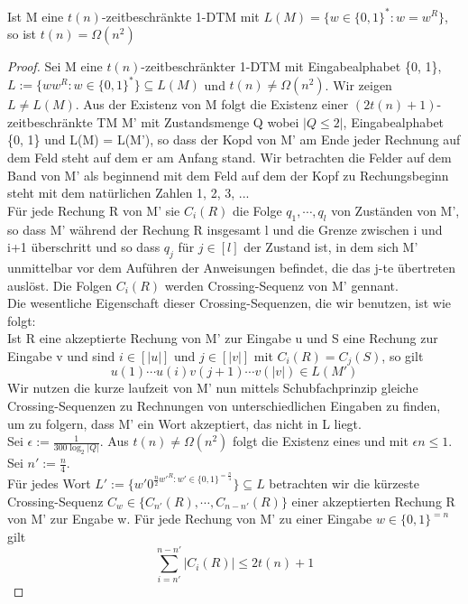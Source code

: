     Ist M eine \(t(n)\)-zeitbeschränkte 1-DTM mit \(L(M) = \{w \in \{0, 1\}^* : w = w^R\}\), so ist \(t(n) = \Omega (n^2)\)
    \begin{proof}
        Sei M eine \(t(n)\)-zeitbeschränkter 1-DTM mit Eingabealphabet \{0, 1\}, \(L := \{ww^R : w \in \{0, 1\}^*\} \subseteq L(M)\) und \(t(n) \not = \Omega (n^2)\). Wir zeigen \(L \not = L(M)\). Aus der Existenz von M folgt die Existenz einer \((2t(n) + 1)\)-zeitbeschränkte TM M' mit Zustandsmenge Q wobei \(|Q \leq 2|\), Eingabealphabet \{0, 1\} und L(M) = L(M'), so dass der Kopd von M' am Ende jeder Rechnung auf dem Feld steht auf dem er am Anfang stand. Wir betrachten die Felder auf dem Band von M' als beginnend mit dem Feld auf dem der Kopf zu Rechungsbeginn steht mit dem natürlichen Zahlen 1, 2, 3, ...\\ Für jede Rechung R von M' sie \(C_i (R)\) die Folge \(q_1, \cdots, q_l\) von Zuständen von M', so dass M' während der Rechung R insgesamt l und die Grenze zwischen i und i+1 überschritt und so dass \(q_j\) für \(j \in [l]\) der Zustand ist, in dem sich M' unmittelbar vor dem Auführen der Anweisungen befindet, die das j-te übertreten auslöst. Die Folgen \(C_i(R)\) werden Crossing-Sequenz von M' gennant.\\ Die wesentliche Eigenschaft dieser Crossing-Sequenzen, die wir benutzen, ist wie folgt:\\ Ist R eine akzeptierte Rechung von M' zur Eingabe u und S eine Rechung zur Eingabe v und sind \(i \in [|u|]\) und \(j \in [|v|]\) mit \(C_i(R) = C_j(S)\), so gilt 
        \[
            u(1) \cdots u(i) v(j+1) \cdots v(|v|) \in L(M')   
        \]
        Wir nutzen die kurze laufzeit von M' nun mittels Schubfachprinzip gleiche Crossing-Sequenzen zu Rechnungen von unterschiedlichen Eingaben zu finden, um zu folgern, dass M' ein Wort akzeptiert, das nicht in L liegt. \\ Sei \(\epsilon := \frac{1}{300 \log_2 |Q|}\). Aus \(t(n) \not = \Omega(n^2)\) folgt die Existenz eines und mit \(\epsilon n \leq 1\). Sei \(n' := \frac{n}{4}\).\\ Für jedes Wort \(L' := \{w' 0^{\frac{n}{2} w'^R : w' \in \{0, 1\}^{=\frac{n}{4}}}\} \subseteq L\) betrachten wir die kürzeste Crossing-Sequenz \(C_w \in \{C_{n'}(R), \cdots, C_{n-n'}(R)\}\) einer akzeptierten Rechung R von M' zur Engabe w. Für jede Rechung von M' zu einer Eingabe \(w \in \{0, 1\}^{= n}\) gilt 
        \[
            \sum\limits_{i=n'}^{n-n'}|C_i(R)| \leq 2t(n)+1
        \]

\end{proof}
